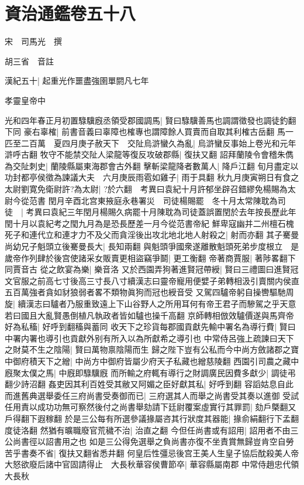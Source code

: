 \chapter{資治通鑑卷五十八}
宋　司馬光　撰

胡三省　音註

漢紀五十|{
	起重光作噩盡強圉單閼凡七年}


孝靈皇帝中

光和四年春正月初置騄驥廐丞領受郡國調馬|{
	賢曰騄驥善馬也調謂徵發也調徒釣翻下同}
豪右辜榷|{
	前書音義曰辜障也榷專也謂障餘人買賣而自取其利榷古岳翻}
馬一匹至二百萬　夏四月庚子赦天下　交阯烏滸蠻久為亂|{
	烏滸蠻反事始上卷光和元年滸呼古翻}
牧守不能禁交阯人梁龍等復反攻破郡縣|{
	復扶又翻}
詔拜蘭陵令會稽朱儁為交阯刺史|{
	蘭陵縣屬東海郡會古外翻}
擊斬梁龍降者數萬人|{
	降戶江翻}
旬月盡定以功封都亭侯徵為諫議大夫　六月庚辰雨雹如雞子|{
	雨于具翻}
秋九月庚寅朔日有食之　太尉劉寛免衛尉許?為太尉|{
	?於六翻　考異曰袁紀十月許郁坐辟召錯繆免楊賜為太尉今從范書}
閏月辛酉北宫東掖庭永巷署災　司徒楊賜罷　冬十月太常陳耽為司徒　|{
	考異曰袁紀三年閏月楊賜久病罷十月陳耽為司徒蓋誤置閏於去年按長歷此年閏十月以袁紀考之閠九月為是恐長歷差一月今從范書帝紀}
鮮卑寇幽并二州檀石槐死子和連代立和連才力不及父而貪淫後出攻北地北地人射殺之|{
	射而亦翻}
其子騫曼尚幼兄子魁頭立後騫曼長大|{
	長知兩翻}
與魁頭爭國衆遂離散魁頭死弟步度根立　是歲帝作列肆於後宫使諸采女販賣更相盜竊爭鬬|{
	更工衡翻}
帝著商賈服|{
	著陟畧翻下同賈音古}
從之飲宴為樂|{
	樂音洛}
又於西園弄狗著進賢冠帶綬|{
	賢曰三禮圖曰進賢冠文官服之前高七寸後高三寸長八寸續漢志曰靈帝寵用便嬖子弟轉相汲引賣關内侯直五百萬強者貪如豺狼弱者畧不類物眞狗而冠也綬音受}
又駕四驢帝躬自操轡驅馳周旋|{
	續漢志曰驢者乃服重致遠上下山谷野人之所用耳何有帝王君子而驂駕之乎天意若曰國且大亂賢愚倒植凡執政者皆如驢也操千高翻}
京師轉相倣效驢價遂與馬齊帝好為私稸|{
	好呼到翻稸與蓄同}
收天下之珍貨每郡國貢獻先輸中署名為導行費|{
	賢曰中署内署也導引也貢獻外别有所入以為所獻希之導引也}
中常侍呂強上疏諫曰天下之財莫不生之陰陽|{
	賢曰萬物禀陰陽而生}
歸之陛下豈有公私而今中尚方斂諸郡之寶中御府積天下之繒|{
	中尚方中御府皆屬少府天子私藏也繒慈陵翻}
西園引司農之藏中廐聚太僕之馬|{
	中廐即騄驥廐}
而所輸之府輒有導行之財調廣民因費多獻少|{
	調徒弔翻少詩沼翻}
姦吏因其利百姓受其敝又阿媚之臣好獻其私|{
	好呼到翻}
容謟姑息自此而進舊典選舉委任三府尚書受奏御而已|{
	三府選其人而舉之尚書受其奏以進御}
受試任用責以成功功無可察然後付之尚書舉劾請下廷尉覆案虛實行其罪罰|{
	劾戶槩翻又戶得翻下遐稼翻}
於是三公每有所選參議掾屬咨其行狀度其器能|{
	掾俞絹翻行下孟翻度徒洛翻}
然猶有曠職廢官荒穢不治|{
	治直之翻}
今但任尚書或有詔用|{
	詔用者不由三公尚書徑以詔書用之也}
如是三公得免選舉之負尚書亦復不坐責賞無歸豈肯空自勞苦乎書奏不省|{
	復扶又翻省悉井翻}
何皇后性彊忌後宫王美人生皇子協后酖殺美人帝大怒欲廢后諸中官固請得止　大長秋華容侯曹節卒|{
	華容縣屬南郡}
中常侍趙忠代領大長秋

